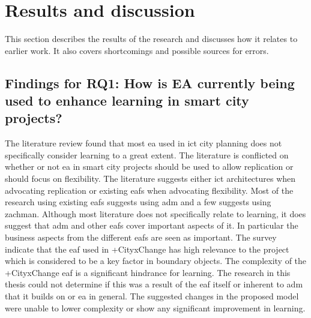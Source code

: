 \chapter{Results and discussion}
\label{chap:result}
This section describes the results of the research and discusses how it relates to earlier work. It also covers shortcomings and possible sources for errors.

\section{Findings for \textbf{RQ1:} How is EA currently being used to enhance learning in smart city projects?}
The literature review found that most \gls{ea} used in \gls{ict} city planning does not specifically consider learning to a great extent. The literature is conflicted on whether or not \gls{ea} in smart city projects should be used to allow replication or should focus on flexibility. The literature suggests either \gls{ict} architectures when advocating replication or existing \glspl{eaf} when advocating flexibility. Most of the research using existing \glspl{eaf} suggests using \gls{adm} and a few suggests using zachman. 
Although most literature does not specifically relate to learning, it does suggest that \gls{adm} and other \glspl{eaf} cover important aspects of it. In particular the business aspects from the different \glspl{eaf} are seen as important. The survey indicate that the \gls{eaf} used in +CityxChange has high relevance to the project which is considered to be a key factor in \glspl{boundary object}. 
The complexity of the +CityxChange \gls{eaf} is a significant hindrance for learning. The research in this thesis could not determine if this was a result of the \gls{eaf} itself or inherent to \gls{adm} that it builds on or \gls{ea} in general. The suggested changes in the proposed model were unable to lower complexity or show any significant improvement in learning.

